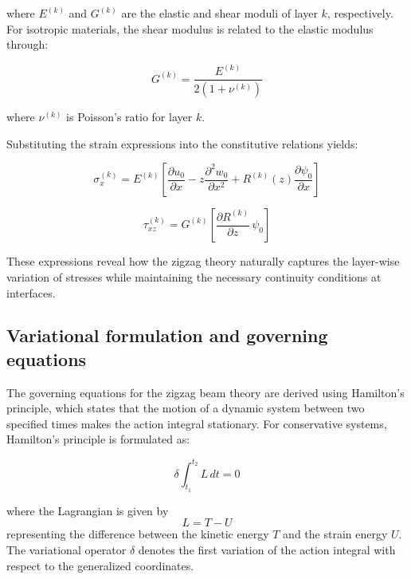 \documentclass[12pt,a4paper]{report}
\begin{document}
where $E^{(k)}$ and $G^{(k)}$ are the elastic and shear moduli of layer $k$, respectively. For isotropic materials, the shear modulus is related to the elastic modulus through:

\begin{equation}
G^{(k)} = \frac{E^{(k)}}{2 \left( 1 + \nu^{(k)} \right)}
\end{equation}


where $\nu^{(k)}$ is Poisson's ratio for layer $k$.

Substituting the strain expressions into the constitutive relations yields:

\begin{equation}
\sigma_x^{(k)} = E^{(k)} \left[ 
\frac{\partial u_0}{\partial x} 
- z \frac{\partial^2 w_0}{\partial x^2} 
+ R^{(k)}(z) \frac{\partial \psi_0}{\partial x} 
\right]
\end{equation}


\begin{equation}
\tau_{xz}^{(k)} = G^{(k)} \left[ 
\frac{\partial R^{(k)}}{\partial z} \, \psi_0 
\right]
\end{equation}


These expressions reveal how the zigzag theory naturally captures the layer-wise variation of stresses while maintaining the necessary continuity conditions at interfaces.

\subsection{Variational formulation and governing equations}
\label{sec:variational}


The governing equations for the zigzag beam theory are derived using Hamilton's principle, which states that the motion of a dynamic system between two specified times makes the action integral stationary. For conservative systems, Hamilton's principle is formulated as:

\begin{equation}
\delta \int_{t_1}^{t_2} L \, dt = 0
\end{equation}

where the Lagrangian is given by
\begin{equation}
L = T - U
\end{equation}
representing the difference between the kinetic energy $T$ and the strain energy $U$. The variational operator $\delta$ denotes the first variation of the action integral with respect to the generalized coordinates.
\end{document}
